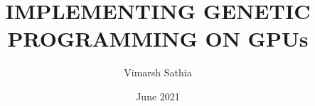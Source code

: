 \documentclass[BTech,thesis]{iitmdiss}
\begin{document}


\title{IMPLEMENTING GENETIC PROGRAMMING ON GPUs}
\author{Vimarsh Sathia}
\date{June 2021}

\begin{singlespace}
\maketitle 
\end{singlespace} 







\begin{singlespace}
\tableofcontents
\thispagestyle{empty}

\listoftables
{}
\listoffigures
{}
\end{singlespace}












\end{document}
